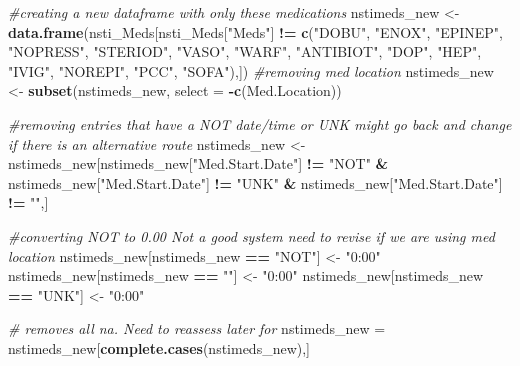 \documentclass[]{article}
\newenvironment{Shaded}{\begin{snugshade}}{\end{snugshade}}
\newcommand{\CommentTok}[1]{\textcolor[rgb]{0.56,0.35,0.01}{\textit{#1}}}
\newcommand{\DataTypeTok}[1]{\textcolor[rgb]{0.13,0.29,0.53}{#1}}
\newcommand{\KeywordTok}[1]{\textcolor[rgb]{0.13,0.29,0.53}{\textbf{#1}}}
\newcommand{\NormalTok}[1]{#1}
\newcommand{\OperatorTok}[1]{\textcolor[rgb]{0.81,0.36,0.00}{\textbf{#1}}}
\newcommand{\StringTok}[1]{\textcolor[rgb]{0.31,0.60,0.02}{#1}}
\begin{document}
\begin{Shaded}
\begin{Highlighting}[]
\CommentTok{#creating a new dataframe with only these medications }
\NormalTok{nstimeds_new <-}\StringTok{ }\KeywordTok{data.frame}\NormalTok{(nsti_Meds[nsti_Meds[}\StringTok{"Meds"}\NormalTok{] }\OperatorTok{!=}\StringTok{ }\KeywordTok{c}\NormalTok{(}\StringTok{"DOBU"}\NormalTok{, }\StringTok{"ENOX"}\NormalTok{, }\StringTok{"EPINEP"}\NormalTok{, }\StringTok{"NOPRESS"}\NormalTok{, }\StringTok{"STERIOD"}\NormalTok{, }\StringTok{"VASO"}\NormalTok{, }\StringTok{"WARF"}\NormalTok{, }
                                                        \StringTok{"ANTIBIOT"}\NormalTok{, }\StringTok{"DOP"}\NormalTok{, }\StringTok{"HEP"}\NormalTok{, }\StringTok{"IVIG"}\NormalTok{, }\StringTok{"NOREPI"}\NormalTok{, }\StringTok{"PCC"}\NormalTok{, }\StringTok{"SOFA"}\NormalTok{),])}
\CommentTok{#removing med location}
\NormalTok{nstimeds_new <-}\StringTok{ }\KeywordTok{subset}\NormalTok{(nstimeds_new, }\DataTypeTok{select =} \OperatorTok{-}\KeywordTok{c}\NormalTok{(Med.Location))}

\CommentTok{#removing entries that have a NOT date/time or UNK might go back and change if there is an alternative route }
\NormalTok{nstimeds_new <-}\StringTok{ }\NormalTok{nstimeds_new[nstimeds_new[}\StringTok{"Med.Start.Date"}\NormalTok{] }\OperatorTok{!=}\StringTok{ "NOT"} \OperatorTok{&}\StringTok{ }\NormalTok{nstimeds_new[}\StringTok{"Med.Start.Date"}\NormalTok{] }\OperatorTok{!=}\StringTok{ "UNK"} \OperatorTok{&}\StringTok{ }\NormalTok{nstimeds_new[}\StringTok{"Med.Start.Date"}\NormalTok{] }\OperatorTok{!=}\StringTok{ ""}\NormalTok{,]}


\CommentTok{#converting NOT to 0.00 Not a good system need to revise if we are using med location }
\NormalTok{nstimeds_new[nstimeds_new }\OperatorTok{==}\StringTok{ "NOT"}\NormalTok{] <-}\StringTok{ "0:00"}
\NormalTok{nstimeds_new[nstimeds_new }\OperatorTok{==}\StringTok{ ""}\NormalTok{]  <-}\StringTok{ "0:00"}
\NormalTok{nstimeds_new[nstimeds_new }\OperatorTok{==}\StringTok{ "UNK"}\NormalTok{]   <-}\StringTok{ "0:00"}

\CommentTok{# removes all na. Need to reassess later for }
\NormalTok{nstimeds_new =}\StringTok{ }\NormalTok{nstimeds_new[}\KeywordTok{complete.cases}\NormalTok{(nstimeds_new),]}
\end{Highlighting}
\end{Shaded}

\begin{Shaded}
\end{Shaded}
\end{document}
